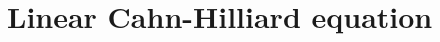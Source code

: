 
\newpage
\section{Linear Cahn-Hilliard equation}%
\label{sec:linear_cahn_hilliard_equation}



\newpage

